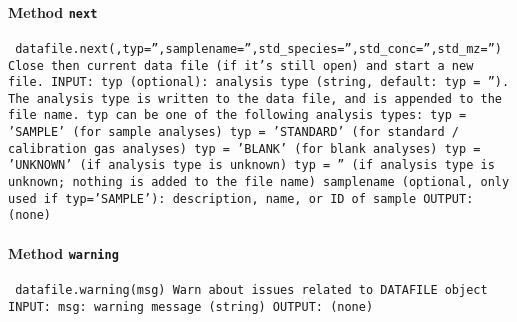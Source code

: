 \paragraph{Method \texttt{next}}
\vspace{1ex}
\texttt{\newline
datafile.next(,typ='',samplename='',std_species='',std_conc='',std_mz='')\newline
\newline
Close then current data file (if it's still open) and start a new file.\newline
\newline
INPUT:\newline
typ (optional): analysis type (string, default: typ = ''). The analysis type is written to the data file, and is appended to the file name. typ can be one of the following analysis types:\newline
typ = 'SAMPLE' (for sample analyses)\newline
typ = 'STANDARD' (for standard / calibration gas analyses)\newline
typ = 'BLANK' (for blank analyses)\newline
typ = 'UNKNOWN' (if analysis type is unknown)\newline
typ = '' (if analysis type is unknown; nothing is added to the file name)\newline
samplename (optional, only used if typ='SAMPLE'): description, name, or ID of sample\newline
\newline
OUTPUT:\newline
(none)\newline
\newline
}

\paragraph{Method \texttt{warning}}
\vspace{1ex}
\texttt{\newline
datafile.warning(msg)\newline
\newline
Warn about issues related to DATAFILE object\newline
\newline
INPUT:\newline
msg: warning message (string)\newline
\newline
OUTPUT:\newline
(none)\newline
\newline
}

